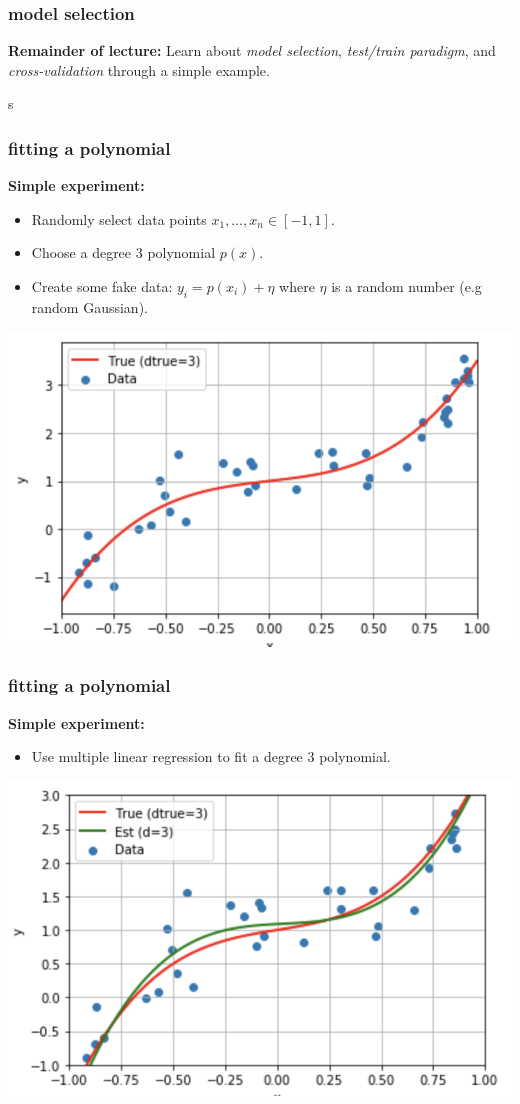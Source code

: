 \documentclass[handout,compress]{beamer}
\begin{document}
\begin{frame}
	\frametitle{model selection}
	\textbf{Remainder of lecture:}
	Learn about \emph{model selection}, \emph{test/train paradigm}, and \emph{cross-validation} through a simple example.
	
s\end{frame}

\begin{frame}
	\frametitle{fitting a polynomial}
	\textbf{Simple experiment:} 
	\begin{itemize}
	\item Randomly select data points $x_1, \ldots, x_n \in [-1,1]$.
	\item Choose a degree 3 polynomial $p(x)$. 
	\item Create some fake data: $y_i = p(x_i) + \eta$ where $\eta$ is a random number (e.g random Gaussian).
	\end{itemize}
	\begin{center}
		\includegraphics[width=.5\textwidth]{data.png}
	\end{center}
\end{frame}

\begin{frame}
	\frametitle{fitting a polynomial}
	\textbf{Simple experiment:} 
	\begin{itemize}
		\item Use multiple linear regression to fit a degree $3$ polynomial.
	\end{itemize}
	\begin{center}
		\includegraphics[width=.5\textwidth]{fit3.png}
	\end{center}
\end{frame}
\end{document}

